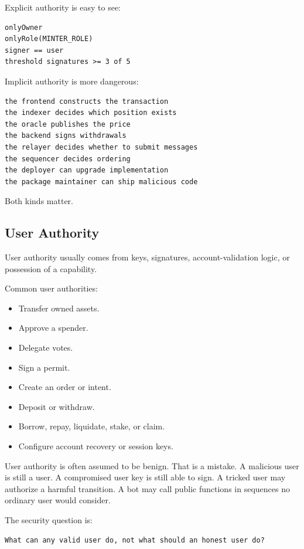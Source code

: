 Explicit authority is easy to see:

\begin{lstlisting}
onlyOwner
onlyRole(MINTER_ROLE)
signer == user
threshold signatures >= 3 of 5
\end{lstlisting}

Implicit authority is more dangerous:

\begin{lstlisting}
the frontend constructs the transaction
the indexer decides which position exists
the oracle publishes the price
the backend signs withdrawals
the relayer decides whether to submit messages
the sequencer decides ordering
the deployer can upgrade implementation
the package maintainer can ship malicious code
\end{lstlisting}

Both kinds matter.

\subsection{User Authority}

User authority usually comes from keys, signatures, account-validation
logic, or possession of a capability.

Common user authorities:

\begin{itemize}
\tightlist
\item
  Transfer owned assets.
\item
  Approve a spender.
\item
  Delegate votes.
\item
  Sign a permit.
\item
  Create an order or intent.
\item
  Deposit or withdraw.
\item
  Borrow, repay, liquidate, stake, or claim.
\item
  Configure account recovery or session keys.
\end{itemize}

User authority is often assumed to be benign. That is a mistake. A
malicious user is still a user. A compromised user key is still able to
sign. A tricked user may authorize a harmful transition. A bot may call
public functions in sequences no ordinary user would consider.

The security question is:

\begin{lstlisting}
What can any valid user do, not what should an honest user do?
\end{lstlisting}

